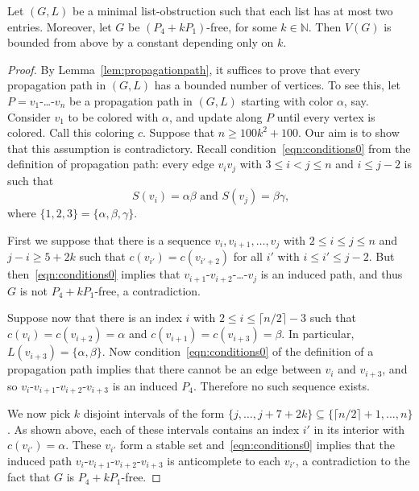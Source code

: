 \documentclass[11pt]{article}
\begin{document}
\begin{lemma}\label{lem:size-2-P4}
Let $(G,L)$ be a minimal list-obstruction such that each list has at most two entries.
Moreover, let $G$ be $(P_4 + k P_1)$-free, for some $k \in \mathbb N$.
Then $V(G)$ is bounded from above by a constant depending only on $k$.
\end{lemma}
\begin{proof}
By Lemma~\ref{lem:propagationpath}, it suffices to prove that every propagation path in $(G,L)$ has a bounded number of vertices.
To see this, let $P=v_1$-\ldots-$v_n$ be a propagation path in $(G,L)$ starting with color $\alpha$, say.
Consider $v_1$ to be colored with $\alpha$, and update along $P$ until every vertex is colored.
Call this coloring $c$.
Suppose that $n \ge 100 k^2+100$.
Our aim is to show that this assumption is contradictory.
Recall condition~\eqref{eqn:conditions0} from the definition of propagation path: every edge $v_iv_j$ with $3 \le i < j \le n$ and $i \le j-2$ is such that 
\begin{equation*}
\mbox{$S(v_i)=\alpha\beta$ and $S(v_j)=\beta\gamma$,} 
\end{equation*}
where $\{1,2,3\} = \{\alpha,\beta,\gamma\}$.

First we suppose that there is a sequence $v_i,v_{i+1},\ldots,v_{j}$ with $2 \le i \le j \le n$ and $j-i \ge 5+2k$ such that $c(v_{i'})=c(v_{i'+2})$ for all $i'$ with $i \le i' \le j-2$.
But then~\eqref{eqn:conditions0} implies that $v_{i+1}$-$v_{i+2}$-\ldots-$v_{j}$ is an induced path, and thus $G$ is not $P_4+k P_1$-free, a contradiction.

Suppose now that there is an index $i$ with $2 \le i \le \lceil n/2\rceil-3$ such that $c(v_i)=c(v_{i+2})=\alpha$ and $c(v_{i+1})=c(v_{i+3})=\beta$.
In particular, $L(v_{i+3})=\{\alpha,\beta\}$.
Now condition~\eqref{eqn:conditions0} of the definition of a propagation path implies that there cannot be an edge between $v_i$ and $v_{i+3}$, and so $v_i$-$v_{i+1}$-$v_{i+2}$-$v_{i+3}$ is an induced $P_4$. Therefore no such sequence exists.

We now pick $k$ disjoint intervals of the form $\{j,\ldots,j+7+2k\} \subseteq \{\lceil n/2\rceil+1,\ldots,n\}$.
As shown above, each of these intervals contains an index $i'$ in its interior with $c(v_{i'})=\alpha$.
These $v_{i'}$ form a stable set and~\eqref{eqn:conditions0} implies that the induced path $v_i$-$v_{i+1}$-$v_{i+2}$-$v_{i+3}$ is anticomplete to each $v_{i'}$, a contradiction to the fact that $G$ is $P_4 + k P_1$-free.


\end{proof}
\end{document}
